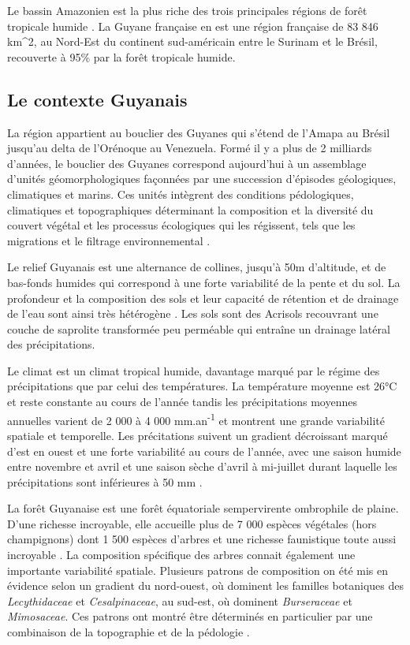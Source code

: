 \documentclass[
  11pt,
  french,
  A4paper,
  extrafontsizes,onecolumn,openright
  ]{memoir}
\begin{document}
Le bassin Amazonien est la plus riche des trois principales régions de
forêt tropicale humide \autocite{Gentry1988}. La Guyane française en est
une région française de 83 846 km\^{}2, au Nord-Est du continent
sud-américain entre le Surinam et le Brésil, recouverte à 95\% par la
forêt tropicale humide.

\subsection{Le contexte Guyanais}\label{le-contexte-guyanais}

La région appartient au bouclier des Guyanes qui s'étend de l'Amapa au
Brésil jusqu'au delta de l'Orénoque au Venezuela. Formé il y a plus de 2
milliards d'années, le bouclier des Guyanes correspond aujourd'hui à un
assemblage d'unités géomorphologiques façonnées par une succession
d'épisodes géologiques, climatiques et marins. Ces unités intègrent des
conditions pédologiques, climatiques et topographiques déterminant la
composition et la diversité du couvert végétal et les processus
écologiques qui les régissent, tels que les migrations et le filtrage
environnemental \autocite{Guitet2015}.

Le relief Guyanais est une alternance de collines, jusqu'à 50m
d'altitude, et de bas-fonds humides qui correspond à une forte
variabilité de la pente et du sol. La profondeur et la composition des
sols et leur capacité de rétention et de drainage de l'eau sont ainsi
très hétérogène \autocites{Ferry2010}{Robert2003}. Les sols sont des
Acrisols recouvrant une couche de saprolite transformée peu perméable
qui entraîne un drainage latéral des précipitations.

Le climat est un climat tropical humide, davantage marqué par le régime
des précipitations que par celui des températures. La température
moyenne est 26°C et reste constante au cours de l'année tandis les
précipitations moyennes annuelles varient de 2 000 à 4 000
mm.an\textsuperscript{-1} et montrent une grande variabilité spatiale et
temporelle. Les précitations suivent un gradient décroissant marqué
d'est en ouest et une forte variabilité au cours de l'année, avec une
saison humide entre novembre et avril et une saison sèche d'avril à
mi-juillet durant laquelle les précipitations sont inférieures à 50 mm
\autocite{Wagner2011}.

La forêt Guyanaise est une forêt équatoriale sempervirente ombrophile de
plaine. D'une richesse incroyable, elle accueille plus de 7 000 espèces
végétales (hors champignons) dont 1 500 espèces d'arbres et une richesse
faunistique toute aussi incroyable \autocite{DeNoter2008}. La
composition spécifique des arbres connait également une importante
variabilité spatiale. Plusieurs patrons de composition on été mis en
évidence selon un gradient du nord-ouest, où dominent les familles
botaniques des \emph{Lecythidaceae} et \emph{Cesalpinaceae}, au sud-est,
où dominent \emph{Burseraceae} et \emph{Mimosaceae}. Ces patrons ont
montré être déterminés en particulier par une combinaison de la
topographie et de la pédologie \autocites{Sabatier1989}[ cf
Toto]{Sabatier1997}{Guitet2015}.
\end{document}

